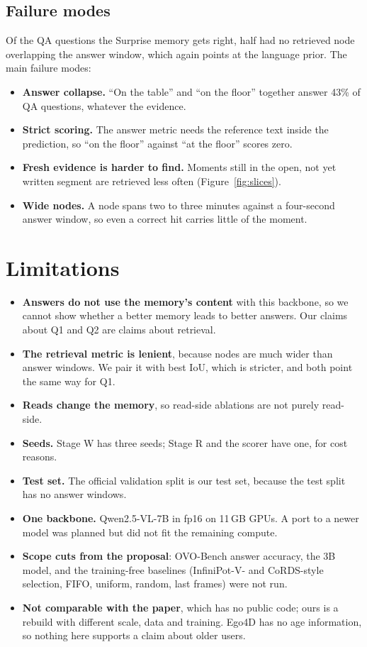 \documentclass[11pt,a4paper]{article}
\begin{document}
\subsection{Failure modes}\label{sec:qual}
Of the QA questions the Surprise memory gets right, half had no retrieved node overlapping the answer window, which again
points at the language prior. The main failure modes:
\begin{itemize}
\item \textbf{Answer collapse.} ``On the table'' and ``on the floor'' together answer 43\% of QA questions, whatever the
  evidence.
\item \textbf{Strict scoring.} The answer metric needs the reference text inside the prediction, so ``on the floor'' against
  ``at the floor'' scores zero.
\item \textbf{Fresh evidence is harder to find.} Moments still in the open, not yet written segment are retrieved less
  often (Figure~\ref{fig:slices}).
\item \textbf{Wide nodes.} A node spans two to three minutes against a four-second answer window, so even a correct hit
  carries little of the moment.
\end{itemize}

\section{Limitations}\label{sec:lim}

\begin{itemize}
\item \textbf{Answers do not use the memory's content} with this backbone, so we cannot show whether a better memory leads to
  better answers. Our claims about Q1 and Q2 are claims about retrieval.
\item \textbf{The retrieval metric is lenient}, because nodes are much wider than answer windows. We pair it with best IoU,
  which is stricter, and both point the same way for Q1.
\item \textbf{Reads change the memory}, so read-side ablations are not purely read-side.
\item \textbf{Seeds.} Stage W has three seeds; Stage R and the scorer have one, for cost reasons.
\item \textbf{Test set.} The official validation split is our test set, because the test split has no answer windows.
\item \textbf{One backbone.} Qwen2.5-VL-7B in fp16 on 11\,GB GPUs. A port to a newer model was planned but did not fit the
  remaining compute.
\item \textbf{Scope cuts from the proposal}: OVO-Bench answer accuracy, the 3B model, and the training-free baselines
  (InfiniPot-V- and CoRDS-style selection, FIFO, uniform, random, last frames) were not run.
\item \textbf{Not comparable with the paper}, which has no public code; ours is a rebuild with different scale, data and
  training. Ego4D has no age information, so nothing here supports a claim about older users.
\end{itemize}
\end{document}
